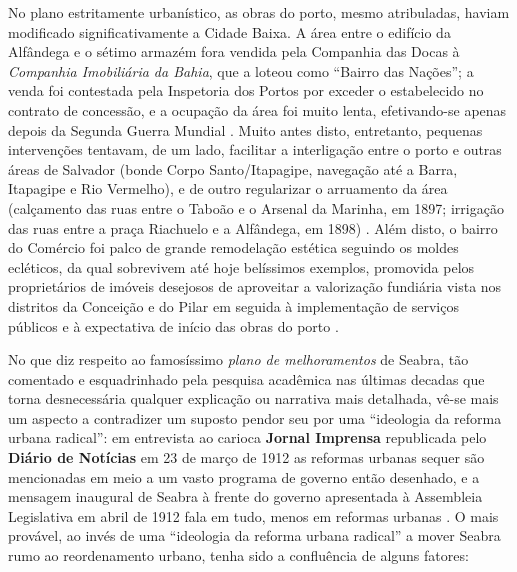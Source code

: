 No plano estritamente urbanístico, as obras do porto, mesmo atribuladas, haviam modificado significativamente a Cidade Baixa. A área entre o edifício da Alfândega e o sétimo armazém fora vendida pela Companhia das Docas à \textit{Companhia Imobiliária da Bahia}, que a loteou como ``Bairro das Nações''; a venda foi contestada pela Inspetoria dos Portos por exceder o estabelecido no contrato de concessão, e a ocupação da área foi muito lenta, efetivando-se apenas depois da Segunda Guerra Mundial \cite[p.~205-206]{almeida_vitrinescomercio_2014}. Muito antes disto, entretanto, pequenas intervenções tentavam, de um lado, facilitar a interligação entre o porto e outras áreas de Salvador (bonde Corpo Santo/Itapagipe, navegação até a Barra, Itapagipe e Rio Vermelho), e de outro regularizar o arruamento da área (calçamento das ruas entre o Taboão e o Arsenal da Marinha, em 1897; irrigação das ruas entre a praça Riachuelo e a Alfândega, em 1898) \cite[p.~208-209]{almeida_vitrinescomercio_2014}. Além disto, o bairro do Comércio foi palco de grande remodelação estética seguindo os moldes ecléticos, da qual sobrevivem até hoje belíssimos exemplos, promovida pelos proprietários de imóveis desejosos de aproveitar a valorização fundiária vista nos distritos da Conceição e do Pilar em seguida à implementação de serviços públicos e à expectativa de início das obras do porto \cite[p.~251-304]{almeida_vitrinescomercio_2014}.

No que diz respeito ao famosíssimo \textit{plano de melhoramentos} de Seabra, tão comentado e esquadrinhado pela pesquisa acadêmica nas últimas decadas que torna desnecessária qualquer explicação ou narrativa mais detalhada, vê-se mais um aspecto a contradizer um suposto pendor seu por uma ``ideologia da reforma urbana radical'': em entrevista ao carioca \textbf{Jornal Imprensa} republicada pelo \textbf{Diário de Notícias} em 23 de março de 1912 as reformas urbanas sequer são mencionadas em meio a um vasto programa de governo então desenhado, e a mensagem inaugural de Seabra à frente do governo apresentada à Assembleia Legislativa em abril de 1912 fala em tudo, menos em reformas urbanas \cite[pp.~92-94]{CUNHA2011}. O mais provável, ao invés de uma ``ideologia da reforma urbana radical'' a mover Seabra rumo ao reordenamento urbano, tenha sido a confluência de alguns fatores:

